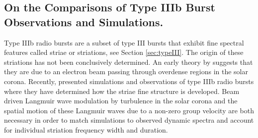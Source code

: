 \subsection{On the Comparisons of Type IIIb Burst Observations and Simulations.}
Type IIIb radio bursts are a subset of type III bursts that exhibit fine spectral features called striae or striations, see Section \ref{sec:typeIII}. The origin of these striations has not been conclusively determined. An early theory by \cite{Takakura1975} suggests that they are due to an electron beam passing through overdense regions in the solar corona. Recently, \cite{Reid2021} presented simulations and observations of type IIIb radio bursts where they have determined how the striae fine structure is developed. Beam driven Langmuir wave modulation by turbulence in the solar corona and the spatial motion of these Langmuir waves due to a non-zero group velocity are both necessary in order to match simulations to observed dynamic spectra and account for individual striation frequency width and duration.

